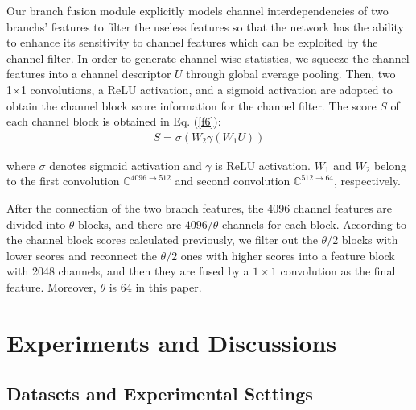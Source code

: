 \documentclass[journal]{IEEEtran}
\begin{document}
Our branch fusion module explicitly models channel interdependencies of two branchs' features to filter the useless features so that the network has the ability to enhance its sensitivity to channel features which can be exploited by the channel filter. In order to generate channel-wise statistics, we squeeze the channel features into a channel descriptor $U$ through global average pooling. Then, two 1×1 convolutions, a ReLU activation, and a sigmoid activation are adopted to obtain the channel block score information for the channel filter. The score $S$ of each channel block is obtained in Eq. (\ref{f6}):
\begin{equation}
\begin{aligned}
S=\sigma (W_{2} \gamma (W_1 U))
\end{aligned}
\label{f6}
\end{equation}


where $\sigma$ denotes sigmoid activation and $\gamma$ is ReLU activation. $W_1$ and $W_2$ belong to the first convolution  $ \mathbb{C}^{4096 \to 512} $ and second convolution $ \mathbb{C}^{512 \to 64} $, respectively. 

After the connection of the two branch features, the 4096 channel features are divided into $\theta$ blocks, and there are $4096/\theta$ channels for each block. According to the channel block scores calculated previously, we filter out the $\theta/2$ blocks with lower scores and reconnect the $\theta/2$ ones with higher scores into a feature block with 2048 channels, and then they are fused by a $1 \times 1$ convolution as the final feature. Moreover, $\theta$ is 64 in this paper.





\section{Experiments and Discussions}
\subsection{Datasets and Experimental Settings}
\end{document}
